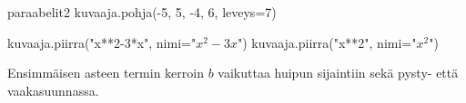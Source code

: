 \begin{luoKuva}{paraabelit2}
	kuvaaja.pohja(-5, 5, -4, 6, leveys=7)
	
	kuvaaja.piirra("x**2-3*x", nimi="$x^2-3x$")
	kuvaaja.piirra("x**2", nimi="$x^2$")
\end{luoKuva}


%	

\begin{center}
\end{center}

Ensimmäisen asteen termin kerroin $b$ vaikuttaa huipun sijaintiin sekä pysty- että vaakasuunnassa.

\begin{center}
\end{center}



%
%	
%




